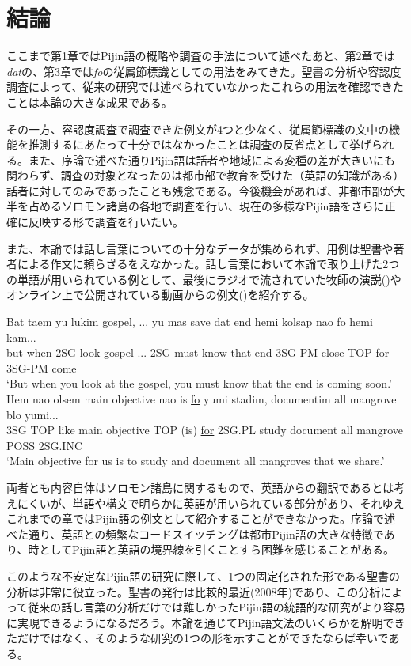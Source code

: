 \chapter{結論}
ここまで第1章ではPijin語の概略や調査の手法について述べたあと、第2章では\textit{dat}の、第3章では\textit{fo}の従属節標識としての用法をみてきた。聖書の分析や容認度調査によって、従来の研究では述べられていなかったこれらの用法を確認できたことは本論の大きな成果である。

その一方、容認度調査で調査できた例文が4つと少なく、従属節標識の文中の機能を推測するにあたって十分ではなかったことは調査の反省点として挙げられる。また、序論で述べた通りPijin語は話者や地域による変種の差が大きいにも関わらず、調査の対象となったのは都市部で教育を受けた（英語の知識がある）話者に対してのみであったことも残念である。今後機会があれば、非都市部が大半を占めるソロモン諸島の各地で調査を行い、現在の多様なPijin語をさらに正確に反映する形で調査を行いたい。

また、本論では話し言葉についての十分なデータが集められず、用例は聖書や著者による作文に頼らざるをえなかった。話し言葉において本論で取り上げた2つの単語が用いられている例として、最後にラジオで流されていた牧師の演説()やオンライン上で公開されている動画からの例文()を紹介する。

\begin{exe}
\ex\label{bokushi}
\gll Bat taem yu lukim gospel, ... yu mas save \underline{dat} end hemi kolsap nao \underline{fo} hemi kam...\\
but when 2SG look gospel ... 2SG must know \underline{that} end 3SG-PM close TOP \underline{for} 3SG-PM come\\
\glt `But when you look at the gospel, you must know that the end is coming soon.'
\ex\label{manguru1}
\gll Hem nao olsem main objective nao is \underline{fo} yumi stadim, documentim all mangrove blo yumi...\\
3SG TOP like main objective TOP (is) \underline{for} 2SG.PL study document all mangrove POSS 2SG.INC\\
\glt `Main objective for us is to study and document all mangroves that we share.'\citep[20分4秒]{manguru}
\end{exe}

両者とも内容自体はソロモン諸島に関するもので、英語からの翻訳であるとは考えにくいが、単語や構文で明らかに英語が用いられている部分があり、それゆえこれまでの章ではPijin語の例文として紹介することができなかった。序論で述べた通り、英語との頻繁なコードスイッチングは都市Pijin語の大きな特徴であり、時としてPijin語と英語の境界線を引くことすら困難を感じることがある。

このような不安定なPijin語の研究に際して、1つの固定化された形である聖書の分析は非常に役立った。聖書の発行は比較的最近(2008年)であり、この分析によって従来の話し言葉の分析だけでは難しかったPijin語の統語的な研究がより容易に実現できるようになるだろう。本論を通じてPijin語文法のいくらかを解明できただけではなく、そのような研究の1つの形を示すことができたならば幸いである。
